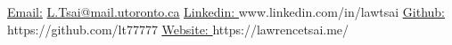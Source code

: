 \documentclass[UTF8]{resume} %
\begin{document}
  \scriptsize\underline{Email:}
            \href{L.Tsai@mail.utoronto.ca}{L.Tsai@mail.utoronto.ca}     {  }
            \href{https://www.linkedin.com/in/lawtsai}{\scriptsize\underline{Linkedin: }}{www.linkedin.com/in/lawtsai}
            {        }
           \href{https://github.com/lt77777}{\scriptsize\underline{Github: }}{https://github.com/lt77777}
           {        }
           \href{https://lawrencetsai.me/}{\scriptsize\underline{Website: }}{https://lawrencetsai.me/}\\
~\vspace{-0.7cm}
\end{document}
